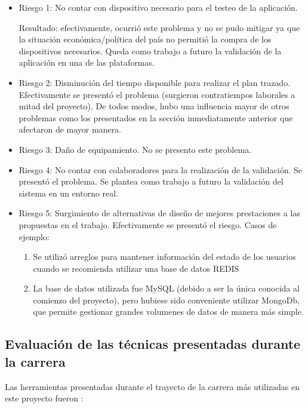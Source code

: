 \begin{itemize}
\item Riesgo 1: No contar con dispositivo necesario para el testeo de la aplicación. 

Resultado: efectivamente, ocurrió este problema y no se pudo mitigar ya que la situación económica/política del país no permitió la compra de los dispositivos necesarios. Queda como trabajo a futuro la validación de la aplicación en una de las plataformas.
\item Riesgo 2: Disminución del tiempo disponible para realizar el plan trazado.
Efectivamente se presentó el problema (surgieron contratiempos laborales a mitad del proyecto). De todos modos, hubo una influencia mayor de otros problemas como los presentados en la sección inmediatamente anterior que afectaron de mayor manera.
\item Riesgo 3: Daño de equipamiento.
No se presento este problema.
\item Riesgo 4: No contar con colaboradores para la realización de la validación.
Se presentó el problema. Se plantea como trabajo a futuro la validación del sistema en un entorno real.
\item Riesgo 5: Surgimiento de alternativas de diseño de mejores prestaciones a las propuestas en el trabajo.
Efectivamente se presentó el riesgo. Casos de ejemplo:
\begin{enumerate}
\item Se utilizó arreglos para mantener información del estado de los usuarios cuando se recomienda utilizar una base de datos REDIS
\item La base de datos utilizada fue MySQL (debido a ser la única conocida al comienzo del proyecto), pero hubiese sido conveniente utilizar MongoDb, que permite gestionar grandes volumenes de datos de manera más simple.
\end{enumerate}
\end{itemize}


\subsection{Evaluación de las técnicas presentadas durante la carrera}

Las herramientas presentadas durante el trayecto de la carrera más utilizadas en este proyecto fueron :

